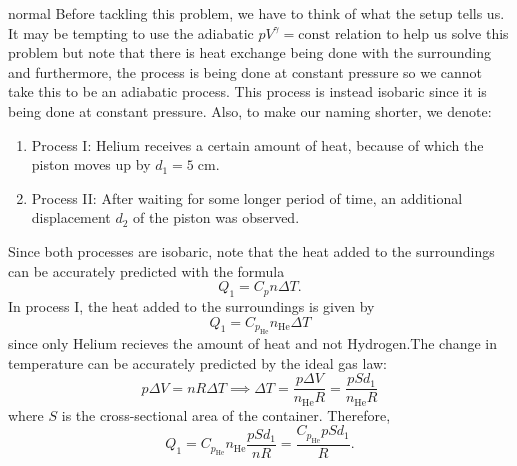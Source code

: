 \begin{solution}{normal}
Before tackling this problem, we have to think of what the setup tells us. It may be tempting to use the adiabatic $pV^{\gamma} = \text{const}$ relation to help us solve this problem but note that there is heat exchange being done with the surrounding and furthermore, the process is being done at constant pressure so we cannot take this to be an adiabatic process. This process is instead isobaric since it is being done at constant pressure. Also, to make our naming shorter, we denote:
\begin{enumerate}
\item Process I: Helium receives a certain amount of heat, because of which the piston moves up by $d_1 = 5\;\mathrm{cm}$.
\item Process II: After waiting for some longer period of time, an additional displacement $d_2$ of the piston was observed.
\end{enumerate}

Since both processes are isobaric, note that the heat added to the surroundings can be accurately predicted with the formula
\[Q_1 = C_p n \Delta T.\]
In process I, the heat added to the surroundings is given by 
\[Q_1 = C_{p_{\text{He}}} n_{\text{He}} \Delta T\]
since only Helium recieves the amount of heat and not Hydrogen.The change in temperature can be accurately predicted by the ideal gas law:
\[p\Delta V = nR\Delta T \implies \Delta T = \frac{p\Delta V}{n_{\text{He}}R} = \frac{pSd_1}{n_{\text{He}}R}\]
where $S$ is the cross-sectional area of the container. Therefore, 
\[Q_1 = C_{p_{\text{He}}} n_{\text{He}}\frac{pSd_1}{nR} = \frac{C_{p_{\text{He}}} p S d_1}{R}.\]


\end{solution}
